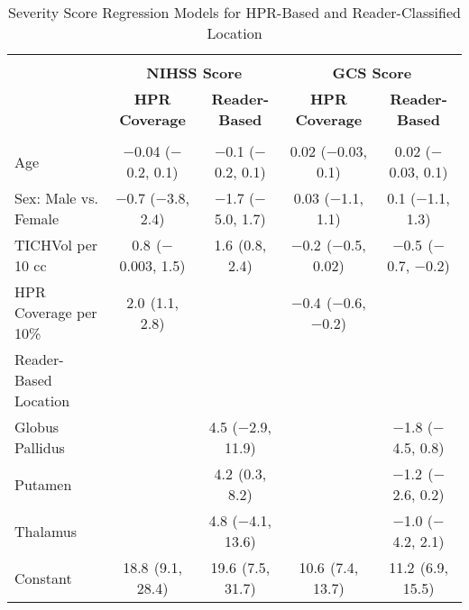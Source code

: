 
\begin{table}[!htbp] \centering 
\begin{tabular}{@{\extracolsep{5pt}}l@{}c@{}c|@{}c@{}c} 
\\[-1.8ex]\hline 
\\[-1.8ex] & \multicolumn{2}{c|}{\textbf{NIHSS Score}} & \multicolumn{2}{c}{\textbf{GCS Score}} \\ 
 & \textbf{HPR Coverage} & \textbf{Reader-Based} & \textbf{HPR Coverage} & \textbf{Reader-Based} \\ 
\hline \\[-1.8ex] 
 Age & $-$0.04 ($-$0.2, 0.1) & $-$0.1 ($-$0.2, 0.1) & 0.02 ($-$0.03, 0.1) & 0.02 ($-$0.03, 0.1) \\ 
  Sex: Male vs. Female & $-$0.7 ($-$3.8, 2.4) & $-$1.7 ($-$5.0, 1.7) & 0.03 ($-$1.1, 1.1) & 0.1 ($-$1.1, 1.3) \\ 
  TICHVol per 10 cc & 0.8$^{}$ ($-$0.003, 1.5) & 1.6$^{}$ (0.8, 2.4) & $-$0.2$^{}$ ($-$0.5, 0.02) & $-$0.5$^{}$ ($-$0.7, $-$0.2) \\ 
  HPR Coverage per 10\% & 2.0$^{}$ (1.1, 2.8) &  & $-$0.4$^{}$ ($-$0.6, $-$0.2) &  \\ 
  Reader-Based Location&&&& \\
\;\;Globus Pallidus &  & 4.5 ($-$2.9, 11.9) &  & $-$1.8 ($-$4.5, 0.8) \\ 
  \;\;Putamen &  & 4.2$^{}$ (0.3, 8.2) &  & $-$1.2$^{}$ ($-$2.6, 0.2) \\ 
  \;\;Thalamus &  & 4.8 ($-$4.1, 13.6) &  & $-$1.0 ($-$4.2, 2.1) \\ 
  Constant & 18.8$^{}$ (9.1, 28.4) & 19.6$^{}$ (7.5, 31.7) & 10.6$^{}$ (7.4, 13.7) & 11.2$^{}$ (6.9, 15.5) \\ 
\hline 
\end{tabular} 
  \caption{Severity Score Regression Models for HPR-Based and Reader-Classified Location} 
  \label{f:beta} 
\end{table} 
